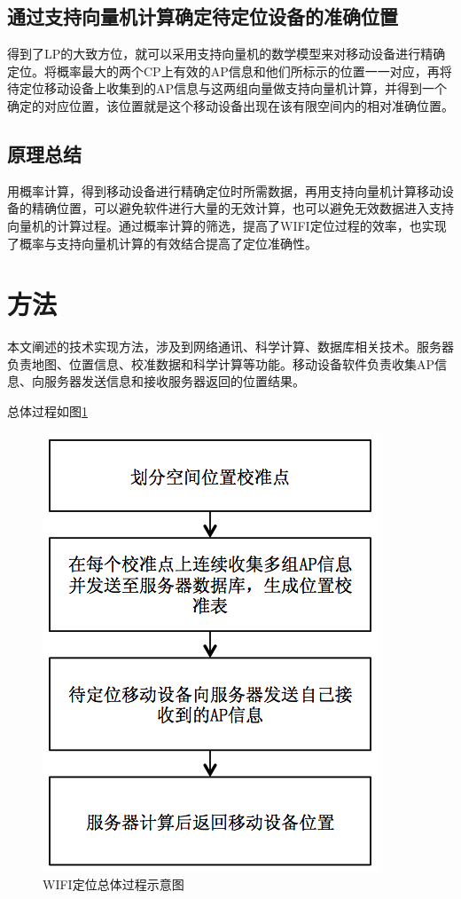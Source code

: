 \documentclass[UTF8, twocolumn ]{ctexart}
\begin{document}
\subsection{通过支持向量机计算确定待定位设备的准确位置}
得到了LP的大致方位，就可以采用支持向量机的数学模型来对移动设备进行精确定位。将概率最大的两个CP上有效的AP信息和他们所标示的位置一一对应，再将待定位移动设备上收集到的AP信息与这两组向量做支持向量机计算，并得到一个确定的对应位置，该位置就是这个移动设备出现在该有限空间内的相对准确位置。
\subsection{原理总结}
用概率计算，得到移动设备进行精确定位时所需数据，再用支持向量机计算移动设备的精确位置，可以避免软件进行大量的无效计算，也可以避免无效数据进入支持向量机的计算过程。通过概率计算的筛选，提高了WIFI定位过程的效率，也实现了概率与支持向量机计算的有效结合提高了定位准确性。


\section{方法}
本文阐述的技术实现方法，涉及到网络通讯、科学计算、数据库相关技术。服务器负责地图、位置信息、校准数据和科学计算等功能。移动设备软件负责收集AP信息、向服务器发送信息和接收服务器返回的位置结果。
\par
总体过程如图\ref{fig:1}
\begin{figure}[!ht]\centering
\includegraphics[keepaspectratio, scale=0.45]{no1.png}
\caption{WIFI定位总体过程示意图\label{fig:1}} 
\end{figure}
\end{document}
